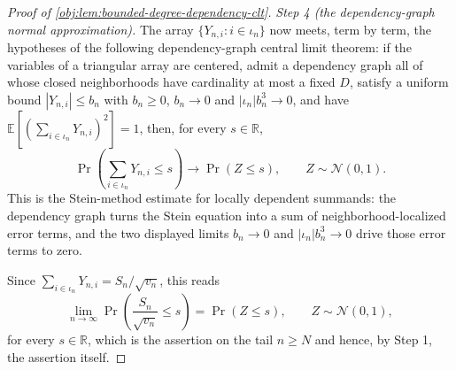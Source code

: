 \begin{proof}[Proof of \cref{obj:lem:bounded-degree-dependency-clt}]
\textit{Step 4 (the dependency-graph normal approximation).} The array \(\{Y_{n,i}:i\in\iota_n\}\) now meets, term by term, the hypotheses of the following dependency-graph central limit theorem: if the variables of a triangular array are centered, admit a dependency graph all of whose closed neighborhoods have cardinality at most a fixed \(D\), satisfy a uniform bound \(|Y_{n,i}|\le b_n\) with \(b_n\ge0\), \(b_n\to0\) and \(|\iota_n|b_n^{3}\to0\), and have
\(\mathbb E[(\sum_{i\in\iota_n}Y_{n,i})^{2}]=1\), then, for every \(s\in\mathbb R\),
\[
\Pr\!\left(\sum_{i\in\iota_n}Y_{n,i}\le s\right)
\longrightarrow
\Pr\!\left(Z\le s\right),
\qquad Z\sim\mathcal N(0,1).
\]
This is the Stein-method estimate for locally dependent summands: the dependency graph turns the Stein equation into a sum of neighborhood-localized error terms, and the two displayed limits \(b_n\to0\) and \(|\iota_n|b_n^{3}\to0\) drive those error terms to zero.

Since \(\sum_{i\in\iota_n}Y_{n,i}=S_n/\sqrt{v_n}\), this reads
\[
\lim_{n\to\infty}\Pr\!\left(\frac{S_n}{\sqrt{v_n}}\le s\right)
=\Pr\!\left(Z\le s\right),
\qquad Z\sim\mathcal N(0,1),
\]
for every \(s\in\mathbb R\), which is the assertion on the tail \(n\ge N\) and hence, by Step 1, the assertion itself.
\end{proof}
